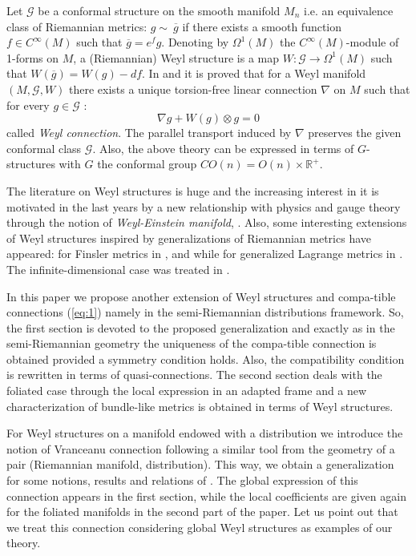\documentclass[11pt,oneside,english]{amsart}
\numberwithin{equation}{section}
\numberwithin{figure}{section}
\theoremstyle{plain}
\theoremstyle{definition}
\theoremstyle{definition}
\theoremstyle{plain}
\theoremstyle{plain}
\theoremstyle{remark}
\theoremstyle{remark}
\begin{document}
Let $\mathcal{G}$ be a conformal structure on the smooth manifold
$M_{n}$ i.e. an equi\-valence class of Riemannian metrics: $g\sim~\overline{g}$
if there exists a smooth function $f\in C^{\infty}\left(M\right)$
such that $\overline{g}=e^{f}g$. Denoting by $\Omega^{1}(M)$ the
$C^{\infty}\left(M\right)$-module of 1-forms on $M$, a (Riemannian)
Weyl structure is a map $W:\mathcal{G}\rightarrow\Omega^{1}\left(M\right)$
such that $W\left(\overline{g}\right)=W\left(g\right)-df$. In \cite{f:l}
and \cite{Sen} it is proved that for a Weyl manifold $\left(M,\mathcal{G},W\right)$
there exists a unique torsion-free linear connection $\nabla$ on
$M$ such that for every $g\in\mathcal{G}$ \cite{h:w}: \begin{equation}
\nabla g+W\left(g\right)\otimes g=0\label{eq:1}\end{equation}
 called \textit{Weyl connection}. The parallel transport induced by
$\nabla$ preserves the given conformal class $\mathcal{G}$. Also,
the above theory can be expressed in terms of $G$-structures with
$G$ the conformal group $CO(n)=O(n)\times\mathbb{R}^{+}$.

The literature on Weyl structures is huge and the increasing interest
in it is motivated in the last years by a new relationship with physics
and gauge theory through the notion of \textit{Weyl-Einstein manifold},
\cite{p:g}. Also, some interesting extensions of Weyl structures
inspired by generalizations of Riemannian metrics have appeared: for
Finsler metrics in \cite{a:i}, \cite{k:l} and \cite{l:k} while
for generalized Lagrange metrics in \cite{m:c}. The infinite-dimensional
case was treated in \cite{m:a}.

In this paper we propose another extension of Weyl structures and
compa-tible connections (\ref{eq:1}) namely in the semi-Riemannian
distributions framework. So, the first section is devoted to the proposed
generalization and exactly as in the semi-Riemannian geometry the
uniqueness of the compa-tible connection is obtained provided a symmetry
condition holds. Also, the compatibility condition is rewritten in
terms of quasi-connections. The second section deals with the foliated
case through the local expression in an adapted frame and a new characterization
of bundle-like metrics is obtained in terms of Weyl structures.

For Weyl structures on a manifold endowed with a distribution we introduce
the notion of Vranceanu connection following a similar tool from the
geometry of a pair (Riemannian manifold, distribution). This way,
we obtain a generalization for some notions, results and relations
of \cite{b:f}. The global expression of this connection appears in
the first section, while the local coefficients are given again for
the foliated manifolds in the second part of the paper. Let us point
out that we treat this connection considering global Weyl structures
as examples of our theory.
\end{document}
